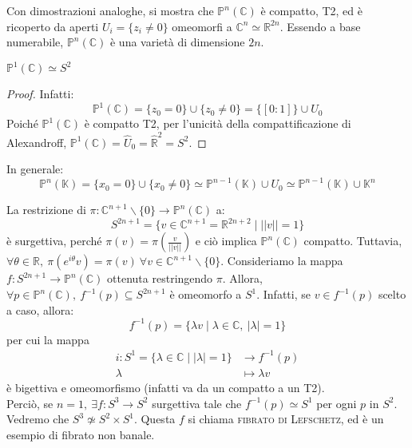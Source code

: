 Con dimostrazioni analoghe, si mostra che $\mathbb{P}^n(\mathbb{C})$ è compatto, T2, ed è ricoperto da aperti $U_i=\{z_i \neq 0\}$ omeomorfi a $\mathbb{C}^n \simeq \mathbb{R}^{2n}$. Essendo a base numerabile, $\mathbb{P}^n(\mathbb{C})$ è una varietà di dimensione $2n$.

\begin{prop}
$\mathbb{P}^1(\mathbb{C}) \simeq S^2$
\end{prop}
\begin{proof}
Infatti:
$$\mathbb{P}^1(\mathbb{C})=\{z_0=0\} \cup \{z_0 \neq 0\}=\{[0:1]\} \cup U_0$$
Poiché $\mathbb{P}^1(\mathbb{C})$ è compatto T2, per l'unicità della compattificazione di Alexandroff, $\mathbb{P}^1(\mathbb{C})=\hat{U}_0=\hat{\mathbb{R}}^2=S^2$.
\end{proof}

In generale:
$$\mathbb{P}^n(\mathbb{K})=\{x_0=0\} \cup \{x_0 \neq 0\} \simeq \mathbb{P}^{n-1}(\mathbb{K}) \cup U_0 \simeq \mathbb{P}^{n-1}(\mathbb{K}) \cup \mathbb{K}^n$$

\begin{ex}
La restrizione di $\pi :\mathbb{C}^{n+1} \smallsetminus \{0\} \rightarrow \mathbb{P}^n(\mathbb{C})$ a:
$$S^{2n+1}=\{v \in \mathbb{C}^{n+1}=\mathbb{R}^{2n+2} \mid ||v||=1\}$$
è surgettiva, perché $\pi(v)=\pi(\frac{v}{||v||})$ e ciò implica $\mathbb{P}^n(\mathbb{C})$ compatto. Tuttavia, $\forall \theta \in \mathbb{R},\ \pi(e^{i\theta}v)=\pi(v) \ \forall v \in \mathbb{C}^{n+1} \smallsetminus \{0\}$. Consideriamo la mappa $f: S^{2n+1} \rightarrow \mathbb{P}^n(\mathbb{C})$ ottenuta restringendo $\pi$. Allora, $\forall p \in \mathbb{P}^n(\mathbb{C}),\ f^{-1}(p) \subseteq S^{2n+1}$ è omeomorfo a $S^1$. Infatti, se $v \in f^{-1}(p)$ scelto a caso, allora:
$$f^{-1}(p)=\{\lambda v \mid \lambda \in \mathbb{C},\ |\lambda|=1\}$$
per cui la mappa
\begin{align*}
i:S^1=\{\lambda \in \mathbb{C} \mid |\lambda|=1\} &\longrightarrow f^{-1}(p) \\
\lambda &\longmapsto \lambda v
\end{align*}
è bigettiva e omeomorfismo (infatti va da un compatto a un T2).\\
Perciò, se $n=1,\ \exists f:S^3 \rightarrow S^2$ surgettiva tale che $f^{-1}(p) \simeq S^1$ per ogni $p$ in $S^2$. Vedremo che $S^3 \not\simeq S^2 \times S^1$. Questa $f$ si chiama \textsc{fibrato di Lefschetz}, ed è un esempio di fibrato non banale.
\end{ex}

